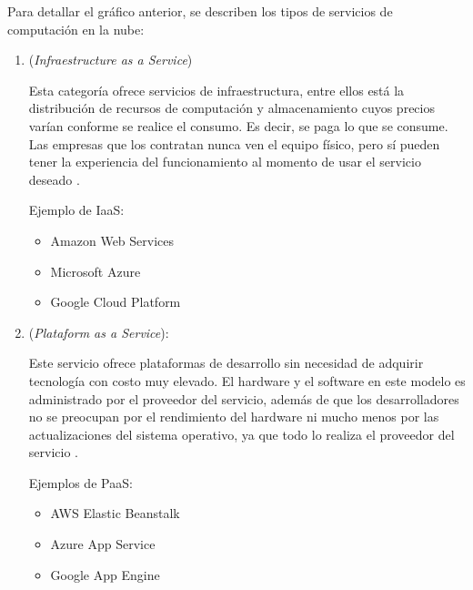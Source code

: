 
Para detallar el gráfico anterior, se describen los tipos de servicios de computación en la nube:

\vspace{1cm}

\begin{enumerate}

\item {}  (\emph{Infraestructure  as  a  Service})

Esta categoría ofrece servicios de infraestructura, entre ellos está la distribución de recursos de computación y almacenamiento cuyos precios varían conforme se realice el consumo. Es decir, se paga lo que se consume. Las empresas que los contratan nunca ven el equipo físico, pero sí pueden tener la experiencia del funcionamiento al momento de usar el servicio deseado \citep{BOOK:2}.

Ejemplo de IaaS:

\begin{itemize}
\item Amazon Web Services
\item Microsoft Azure
\item Google Cloud Platform
\end{itemize}

\vspace{0.5cm}

\item {} (\emph{Plataform as a Service}):

Este servicio ofrece plataformas de desarrollo sin necesidad de adquirir tecnología con costo muy elevado. El hardware y el software en este modelo es administrado por el proveedor del servicio, además de que los desarrolladores no se preocupan por el rendimiento del hardware ni mucho menos por las actualizaciones del sistema operativo, ya que todo lo realiza el proveedor del servicio \citep{BOOK:2}.
 
Ejemplos de PaaS:

\begin{itemize}
\item AWS Elastic Beanstalk
\item Azure App Service
\item Google App Engine

\end{itemize}

\vspace{0.5cm}


\end{enumerate}

